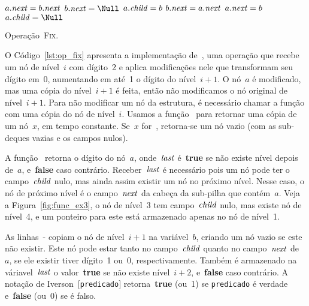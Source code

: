\documentclass[main.tex]{subfiles}
\begin{document}
\begin{algorithm}
\begin{algorithmic}[1]
          \label{line:fix:next_a_bb}
            \State $a.\mathit{next} = b.\mathit{next}$
            \State $b.\V{next} = \Null$ \label{line:fix:next_a_be}
        \EndIf
        \State $a.\mathit{child} = b$ \label{line:fix:child_a_b}
    \Else
         \label{line:fix:next_b_ab}
            \State $b.\mathit{next} = a.\mathit{next}$  \label{line:fix:next_b_ae}
        \EndIf
        \State $a.\mathit{next} = b$ \label{line:fix:child_b_ab}
        \State $a.\V{child} = \Null$  \label{line:fix:child_b_ae}
    \EndIf
\EndFunction

\end{algorithmic}
\caption{Operação~\textsc{Fix}.} \label{lst:op_fix}
\end{algorithm}

O Código~\ref{lst:op_fix} apresenta a implementação de~, uma operação que recebe um nó de nível~$i$ com dígito~2 e aplica modificações nele que transformam seu dígito em~0, aumentando em até~1 o dígito do nível~$i+1$. O nó~$a$ é modificado, mas uma cópia do nível~$i+1$ é feita, então não modificamos o nó original de nível~$i+1$. Para não modificar um nó da estrutura, é necessário chamar a função com uma cópia do nó de nível~$i$. Usamos a função~ para retornar uma cópia de um nó~$x$, em tempo constante. Se~$x$ for~, retorna-se um nó vazio (com as sub-deques vazias e os campos nulos).

A função~ retorna o dígito do nó~$a$, onde~$\mathit{last}$ é~\textbf{true} se não existe nível depois de~$a$, e~\textbf{false} caso contrário. Receber~$\mathit{last}$ é necessário pois um nó pode ter o campo~$\mathit{child}$ nulo, mas ainda assim existir um nó no próximo nível. Nesse caso, o nó de próximo nível é o campo~$\mathit{next}$ da cabeça da sub-pilha que contém~$a$. Veja a Figura~\ref{fig:func_ex3}, o nó de nível~3 tem campo~$\mathit{child}$ nulo, mas existe nó de nível~4, e um ponteiro para este está armazenado apenas no nó de nível~1.

As linhas~{-} copiam o nó de nível~$i+1$ na variável~$b$, criando um nó vazio se este não existir. Este nó pode estar tanto no campo~$\mathit{child}$ quanto no campo~$\mathit{next}$ de~$a$, se ele existir tiver dígito~1 ou~0, respectivamente.
Também é armazenado na váriavel~$\mathit{last}$ o valor~\textbf{true} se não existe nível~$i+2$, e~\textbf{false} caso contrário. A notação de Iverson~$[$\texttt{predicado}$]$ retorna~\textbf{true} (ou~1) se \texttt{predicado} é verdade e~\textbf{false} (ou~0) se é falso.
\end{document}
